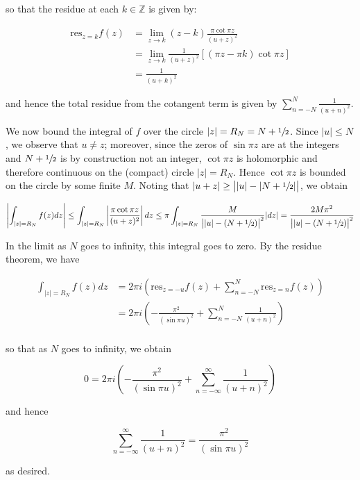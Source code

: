 \begin{solution}
  so that the residue at each $k \in \mathbb{Z}$ is given by:

  \begin{align*}
    \text{res}_{z = k} f(z) &= \lim\limits_{z \to k} (z - k) \frac{\pi \cot{\pi z}}{(u + z)^2} \\
                            &= \lim\limits_{z \to k} \frac{1}{(u + z)^2} \left[(\pi z - \pi k) \cot{\pi z} \right] \\
                            &= \frac{1}{(u + k)^2}
  \end{align*}

  and hence the total residue from the cotangent term is given by $\sum_{n = -N}^{N} \frac{1}{(u + n)^2}$.

  We now bound the integral of $f$ over the circle $|z| = R_N = N + \sfrac{1}{2}$. Since $|u| \le N$, we observe 
  that $u \neq z$; moreover, since the zeros of $\sin{\pi z}$ are at the integers and $N + \sfrac{1}{2}$ is by 
  construction not an integer, $\cot{\pi z}$ is holomorphic and therefore continuous on the (compact) circle 
  $|z| = R_N$. Hence $\cot{\pi z}$ is bounded on the circle by some finite $M$. Noting that 
  $|u + z| \ge \big||u| - |N + \sfrac{1}{2}|\big|$, we obtain

  $$
  \left| \int_{|z| = R_N} f(z) dz \right| 
    \le \int_{|z| = R_N} \left| \frac{\pi \cot{\pi z}}{(u + z)^2} \right| dz
    \le \pi \int_{|z| = R_N} \frac{M}{\big||u| - (N + \sfrac{1}{2})\big|^2} |dz|
    = \frac{2 M \pi^2}{\big||u| - (N + \sfrac{1}{2})\big|^2}
  $$

  In the limit as $N$ goes to infinity, this integral goes to zero. By the residue theorem, we have

  \begin{align*}
  \int_{|z| = R_N} f(z) dz &= 2 \pi i \left( \text{res}_{z = -u} f(z) + \sum_{n = -N}^{N} \text{res}_{z = n} f(z) \right) \\
                           &= 2 \pi i \left( -\frac{\pi^2}{(\sin{\pi u})^2} + \sum_{n = -N}^{N} \frac{1}{(u + n)^2} \right) \\ 
  \end{align*}

  so that as $N$ goes to infinity, we obtain

  $$
    0 = 2 \pi i \left( -\frac{\pi^2}{(\sin{\pi u})^2} + \sum_{n = -\infty}^{\infty} \frac{1}{(u + n)^2} \right)
  $$

  and hence

  $$
    \sum_{n = -\infty}^{\infty} \frac{1}{(u + n)^2} = \frac{\pi^2}{(\sin{\pi u})^2}
  $$

  as desired.
  \ \\
\end{solution}